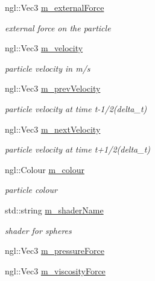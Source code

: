 \begin{DoxyCompactItemize}
ngl::Vec3 \hyperlink{classParticle_aa30f0a6fac4bee02f1082a2ebb04e7a5}{m\_\-externalForce}
\begin{DoxyCompactList}\small\item\em external force on the particle \item\end{DoxyCompactList}\item 
ngl::Vec3 \hyperlink{classParticle_a3c6edff3c6a05d7eaac8eeb261bc0383}{m\_\-velocity}
\begin{DoxyCompactList}\small\item\em particle velocity in m/s \item\end{DoxyCompactList}\item 
ngl::Vec3 \hyperlink{classParticle_ac1b3d740751addafa14c3533a155277a}{m\_\-prevVelocity}
\begin{DoxyCompactList}\small\item\em particle velocity at time t-\/1/2(delta\_\-t) \item\end{DoxyCompactList}\item 
ngl::Vec3 \hyperlink{classParticle_ad27e14ae4bd99b1975413f6881d8aea1}{m\_\-nextVelocity}
\begin{DoxyCompactList}\small\item\em particle velocity at time t+1/2(delta\_\-t) \item\end{DoxyCompactList}\item 
ngl::Colour \hyperlink{classParticle_a6095555452db7271e32380a188e1004e}{m\_\-colour}
\begin{DoxyCompactList}\small\item\em particle colour \item\end{DoxyCompactList}\item 
std::string \hyperlink{classParticle_a621671d7f023719e95f295408dd9f18d}{m\_\-shaderName}
\begin{DoxyCompactList}\small\item\em shader for spheres \item\end{DoxyCompactList}\item 
ngl::Vec3 \hyperlink{classParticle_acf7bf74338658f448da9bf323b748bb4}{m\_\-pressureForce}
\item 
ngl::Vec3 \hyperlink{classParticle_a40a8a467bfd99235cef6e1685a509869}{m\_\-viscosityForce}
\end{DoxyCompactItemize}


